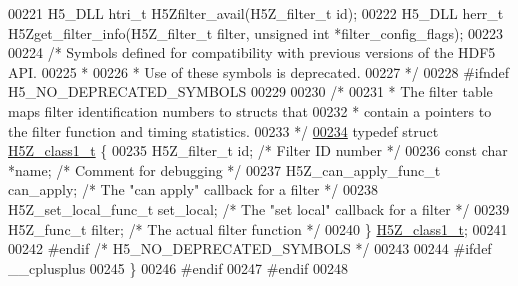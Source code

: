 \begin{DoxyCode}
00221 H5\_DLL htri\_t H5Zfilter\_avail(H5Z\_filter\_t \textcolor{keywordtype}{id});
00222 H5\_DLL herr\_t H5Zget\_filter\_info(H5Z\_filter\_t filter, \textcolor{keywordtype}{unsigned} \textcolor{keywordtype}{int} *filter\_config\_flags);
00223 
00224 \textcolor{comment}{/* Symbols defined for compatibility with previous versions of the HDF5 API.}
00225 \textcolor{comment}{ *}
00226 \textcolor{comment}{ * Use of these symbols is deprecated.}
00227 \textcolor{comment}{ */}
00228 \textcolor{preprocessor}{#ifndef H5\_NO\_DEPRECATED\_SYMBOLS}
00229 
00230 \textcolor{comment}{/*}
00231 \textcolor{comment}{ * The filter table maps filter identification numbers to structs that}
00232 \textcolor{comment}{ * contain a pointers to the filter function and timing statistics.}
00233 \textcolor{comment}{ */}
\hyperlink{struct_h5_z__class1__t}{00234} \textcolor{keyword}{typedef} \textcolor{keyword}{struct }\hyperlink{struct_h5_z__class1__t}{H5Z\_class1\_t} \{
00235     H5Z\_filter\_t id;        \textcolor{comment}{/* Filter ID number              */}
00236     \textcolor{keyword}{const} \textcolor{keywordtype}{char}  *name;      \textcolor{comment}{/* Comment for debugging             */}
00237     H5Z\_can\_apply\_func\_t can\_apply; \textcolor{comment}{/* The "can apply" callback for a filter */}
00238     H5Z\_set\_local\_func\_t set\_local; \textcolor{comment}{/* The "set local" callback for a filter */}
00239     H5Z\_func\_t filter;      \textcolor{comment}{/* The actual filter function            */}
00240 \} \hyperlink{struct_h5_z__class1__t}{H5Z\_class1\_t};
00241 
00242 \textcolor{preprocessor}{#endif }\textcolor{comment}{/* H5\_NO\_DEPRECATED\_SYMBOLS */}\textcolor{preprocessor}{}
00243 
00244 \textcolor{preprocessor}{#ifdef \_\_cplusplus}
00245 \}
00246 \textcolor{preprocessor}{#endif}
00247 \textcolor{preprocessor}{#endif}
00248 
\end{DoxyCode}
